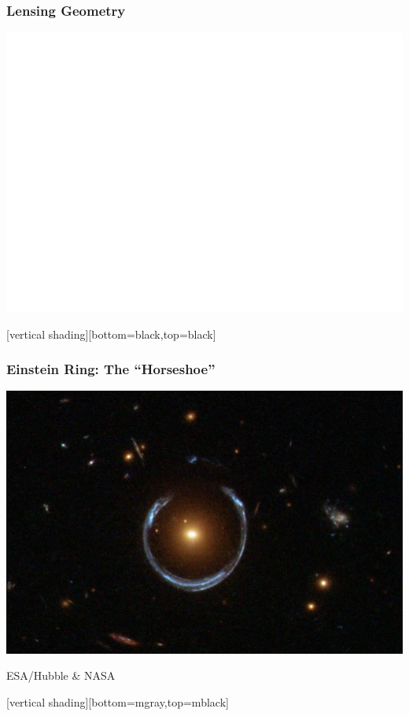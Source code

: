 \documentclass{beamer}
\begin{document}
\frame
{
    \frametitle{Lensing Geometry}

    \begin{center}
        \includegraphics[scale=0.5]{lens_geometry_invert.pdf}
    \end{center}
}


{
    [vertical shading][bottom=black,top=black]
	
    \frame
    {
        \frametitle{Einstein Ring: The ``Horseshoe''}

        \begin{center}
            \includegraphics[height=0.7\textheight]{A_Horseshoe_Einstein_Ring_from_Hubble.JPG}

            {\tiny \hfill ESA/Hubble \& NASA}
        \end{center}
    }

    [vertical shading][bottom=mgray,top=mblack]

}
\end{document}
